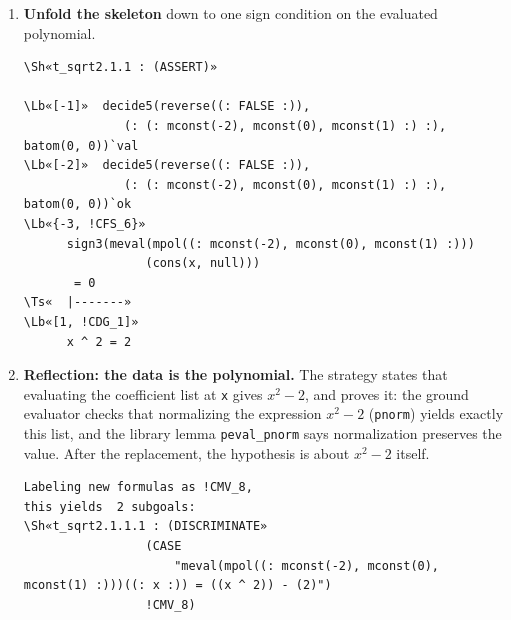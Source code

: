 \documentclass[11pt]{article}
\newcommand\Lb[1]{\textcolor{muted}{#1}}
\newcommand\Ts[1]{\textcolor{muted}{#1}}
\newcommand\Sh[1]{\textcolor{accent}{#1}}
\begin{document}
\begin{enumerate}[leftmargin=1.4em, itemsep=10pt, label=\textbf{\textcolor{accent}{\arabic*}}]
\begin{termbox}
\begin{Verbatim}[commandchars=\\«»]
\Lb«[-1]»  decide5(reverse((: FALSE :)),
              (: (: mconst(-2), mconst(0), mconst(1) :) :), batom(0, 0))`val
\Lb«[-2]»  decide5(reverse((: FALSE :)),
              (: (: mconst(-2), mconst(0), mconst(1) :) :), batom(0, 0))`ok
\Lb«{-3, !CFS_6}»
      bfeval(batom(0, 0), (: (: mconst(-2), mconst(0), mconst(1) :) :),
             cons(x, null))
\Ts«  |-------»
\Lb«[1, !CDG_1]»
      EXISTS (x: real): x ^ 2 = 2

Instantiating the top quantifier in !CDG_1 with the terms:
 x,
this simplifies to:
\Sh«t_sqrt2.1.1 : (INST !CDG_1 "x")»

\Lb«[-1]»  decide5(reverse((: FALSE :)),
              (: (: mconst(-2), mconst(0), mconst(1) :) :), batom(0, 0))`val
\Lb«[-2]»  decide5(reverse((: FALSE :)),
              (: (: mconst(-2), mconst(0), mconst(1) :) :), batom(0, 0))`ok
\Lb«[-3, !CFS_6]»
      bfeval(batom(0, 0), (: (: mconst(-2), mconst(0), mconst(1) :) :),
             cons(x, null))
\Ts«  |-------»
\Lb«{1, !CDG_1}»
      x ^ 2 = 2
\end{Verbatim}
\end{termbox}

\item \textbf{Unfold the skeleton} down to one sign condition on the evaluated polynomial.
\begin{termbox}
\begin{Verbatim}[commandchars=\\«»]
\Sh«t_sqrt2.1.1 : (ASSERT)»

\Lb«[-1]»  decide5(reverse((: FALSE :)),
              (: (: mconst(-2), mconst(0), mconst(1) :) :), batom(0, 0))`val
\Lb«[-2]»  decide5(reverse((: FALSE :)),
              (: (: mconst(-2), mconst(0), mconst(1) :) :), batom(0, 0))`ok
\Lb«{-3, !CFS_6}»
      sign3(meval(mpol((: mconst(-2), mconst(0), mconst(1) :)))
                 (cons(x, null)))
       = 0
\Ts«  |-------»
\Lb«[1, !CDG_1]»
      x ^ 2 = 2
\end{Verbatim}
\end{termbox}

\item \textbf{Reflection: the data is the polynomial.} The strategy states that evaluating the coefficient list at \texttt{x}
gives $x^2 - 2$, and proves it: the ground evaluator checks that normalizing the expression $x^2 - 2$ (\texttt{pnorm}) yields exactly this list,
and the library lemma \texttt{peval\_pnorm} says normalization preserves the value. After the replacement, the hypothesis
is about $x^2 - 2$ itself.
\begin{termbox}
\begin{Verbatim}[commandchars=\\«»]
Labeling new formulas as !CMV_8,
this yields  2 subgoals:
\Sh«t_sqrt2.1.1.1 : (DISCRIMINATE»
                 (CASE
                     "meval(mpol((: mconst(-2), mconst(0), mconst(1) :)))((: x :)) = ((x ^ 2)) - (2)")
                 !CMV_8)


\end{Verbatim}
\end{termbox}
\end{enumerate}
\end{document}
